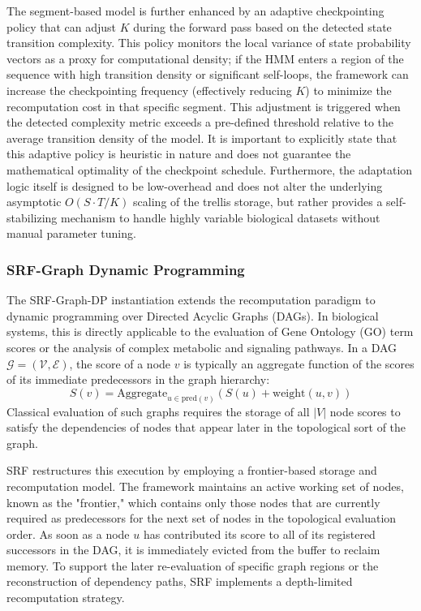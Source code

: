 The segment-based model is further enhanced by an adaptive checkpointing policy that can adjust $K$ during the forward pass based on the detected state transition complexity. This policy monitors the local variance of state probability vectors as a proxy for computational density; if the HMM enters a region of the sequence with high transition density or significant self-loops, the framework can increase the checkpointing frequency (effectively reducing $K$) to minimize the recomputation cost in that specific segment. This adjustment is triggered when the detected complexity metric exceeds a pre-defined threshold relative to the average transition density of the model. It is important to explicitly state that this adaptive policy is heuristic in nature and does not guarantee the mathematical optimality of the checkpoint schedule. Furthermore, the adaptation logic itself is designed to be low-overhead and does not alter the underlying asymptotic $O(S \cdot T/K)$ scaling of the trellis storage, but rather provides a self-stabilizing mechanism to handle highly variable biological datasets without manual parameter tuning.

\subsubsection{SRF-Graph Dynamic Programming}

The SRF-Graph-DP instantiation extends the recomputation paradigm to dynamic programming over Directed Acyclic Graphs (DAGs). In biological systems, this is directly applicable to the evaluation of Gene Ontology (GO) term scores or the analysis of complex metabolic and signaling pathways. In a DAG $\mathcal{G} = (\mathcal{V}, \mathcal{E})$, the score of a node $v$ is typically an aggregate function of the scores of its immediate predecessors in the graph hierarchy:
\begin{equation}
S(v) = \text{Aggregate}_{u \in \text{pred}(v)} (S(u) + \text{weight}(u, v))
\end{equation}
Classical evaluation of such graphs requires the storage of all $|V|$ node scores to satisfy the dependencies of nodes that appear later in the topological sort of the graph.

SRF restructures this execution by employing a frontier-based storage and recomputation model. The framework maintains an active working set of nodes, known as the "frontier," which contains only those nodes that are currently required as predecessors for the next set of nodes in the topological evaluation order. As soon as a node $u$ has contributed its score to all of its registered successors in the DAG, it is immediately evicted from the buffer to reclaim memory. To support the later re-evaluation of specific graph regions or the reconstruction of dependency paths, SRF implements a depth-limited recomputation strategy.

